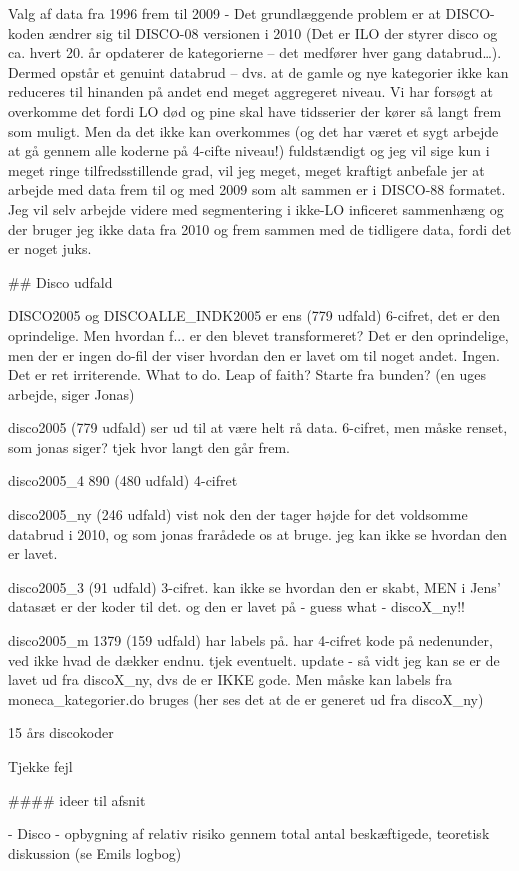 Valg af data fra 1996 frem til 2009
- Det grundlæggende problem er at DISCO-koden ændrer sig til DISCO-08 versionen i 2010 (Det er ILO der styrer disco og ca. hvert 20. år opdaterer de kategorierne – det medfører hver gang databrud…). Dermed opstår et genuint databrud – dvs. at de gamle og nye kategorier ikke kan reduceres til hinanden på andet end meget aggregeret niveau. Vi har forsøgt at overkomme det fordi LO død og pine skal have tidsserier der kører så langt frem som muligt. Men da det ikke kan overkommes (og det har været et sygt arbejde at gå gennem alle koderne på 4-cifte niveau!) fuldstændigt og jeg vil sige kun i meget ringe tilfredsstillende grad, vil jeg meget, meget kraftigt anbefale jer at arbejde med data frem til og med 2009 som alt sammen er i DISCO-88 formatet. Jeg vil selv arbejde videre med segmentering i ikke-LO inficeret sammenhæng og der bruger jeg ikke data fra 2010 og frem sammen med de tidligere data, fordi det er noget juks.


## Disco udfald 

DISCO2005 og DISCOALLE_INDK2005 er ens (779 udfald) 
6-cifret, det er den oprindelige. Men hvordan f... er den blevet transformeret?
Det er den oprindelige, men der er ingen do-fil der viser hvordan den er lavet om til noget andet. Ingen. Det er ret irriterende. What to do. Leap of faith? Starte fra bunden? (en uges arbejde, siger Jonas)

disco2005 (779 udfald)
ser ud til at være helt rå data. 6-cifret, men måske renset, som jonas siger? tjek hvor langt den går frem.

disco2005_4 890 (480 udfald)
4-cifret

disco2005_ny (246 udfald)
vist nok den der tager højde for det voldsomme databrud i 2010, og som jonas frarådede os at bruge. jeg kan ikke se hvordan den er lavet.

disco2005_3 (91 udfald)
3-cifret. kan ikke se hvordan den er skabt, MEN i Jens' datasæt er der koder til det. og den er lavet på  - guess what - discoX_ny!!

disco2005_m 1379 (159 udfald)
har labels på. har 4-cifret kode på nedenunder, ved ikke hvad de dækker endnu. tjek eventuelt.  update - så vidt jeg kan se er de lavet ud fra discoX_ny, dvs de er IKKE gode. Men måske kan labels fra moneca_kategorier.do bruges (her ses det at de er generet ud fra discoX_ny)



15 års discokoder

Tjekke fejl


#### ideer til afsnit

- Disco
- opbygning af relativ risiko gennem total antal beskæftigede, teoretisk diskussion (se Emils logbog)














